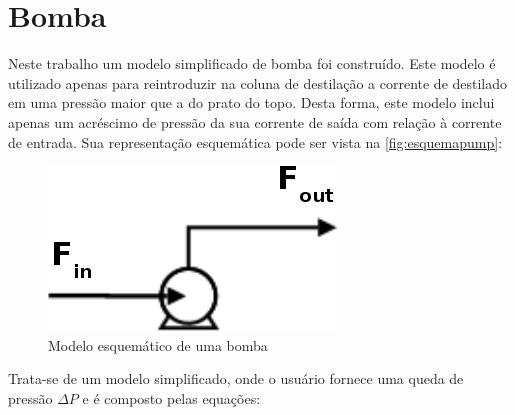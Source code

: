 
\section{Bomba} \label{sec:modelobomba}
Neste trabalho um modelo simplificado de bomba foi construído.
Este modelo é utilizado apenas para reintroduzir na coluna de destilação a corrente de destilado em uma pressão maior
que a do prato do topo. Desta forma, este modelo inclui apenas um acréscimo de pressão da sua corrente de saída com
relação à corrente de entrada.
Sua representação esquemática pode ser vista na \autoref{fig:esquemapump}:

\begin{figure}[htb]
\centering \includegraphics[scale=0.5]{images/Chap3/esquemapump2.png}
\caption{Modelo esquemático de uma bomba}
\label{fig:esquemapump}
\end{figure}

Trata-se de um modelo simplificado, onde o usuário fornece uma queda de pressão $\Delta P$ e é composto pelas equações:

